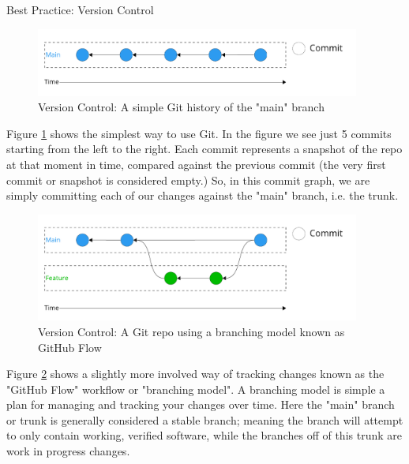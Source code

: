\documentclass[final]{beamer}
\newlength{\colwidth}
\begin{document}
\begin{frame}[t]
\begin{columns}[t]
\begin{column}{\colwidth}
\begin{block}{Best Practice: Version Control}
    \begin{figure}
      \centering
      \includegraphics[width=0.95\textwidth]{tess2024/git-simple-git-repo.pdf}
      \caption{Version Control: A simple Git history of the "main" branch}
      \label{fig:git-simple}
    \end{figure}

    Figure \ref*{fig:git-simple} shows the simplest way to use Git.
    In the figure we see just 5 commits starting from the left to the right.
    Each commit represents a snapshot of the repo at that moment in time,
    compared against the previous commit (the very first commit or snapshot
    is considered empty.)
    So, in this commit graph, we are simply committing each of our changes
    against the "main" branch, i.e. the trunk.

    \begin{figure}
      \centering
      \includegraphics[width=0.95\textwidth]{tess2024/git-github-flow.pdf}
      \caption{Version Control: A Git repo using a branching model known as
        GitHub Flow}
      \label{fig:git-github-flow}
    \end{figure}

    Figure \ref*{fig:git-github-flow} shows a slightly more involved way of
    tracking changes known as the "GitHub Flow" workflow or "branching model".
    A branching model is simple a plan for managing and tracking your changes
    over time.
    Here the "main" branch or trunk is generally considered a stable branch;
    meaning the branch will attempt to only contain working, verified software,
    while the branches off of this trunk are work in progress changes.
    

\end{block}
\end{column}
\end{columns}
\end{frame}
\end{document}
